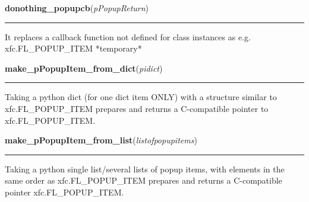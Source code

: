     \label{xformslib:library:donothing_popupcb}

    \vspace{0.5ex}

\hspace{.8\funcindent}\begin{boxedminipage}{\funcwidth}

    \raggedright \textbf{donothing\_popupcb}(\textit{pPopupReturn})

    \vspace{-1.5ex}

    \rule{\textwidth}{0.5\fboxrule}
\setlength{\parskip}{2ex}
    It replaces a callback function not defined for class instances as e.g.
    xfc.FL\_POPUP\_ITEM            *temporary*

\setlength{\parskip}{1ex}
    \end{boxedminipage}

    \label{xformslib:library:make_pPopupItem_from_dict}

    \vspace{0.5ex}

\hspace{.8\funcindent}\begin{boxedminipage}{\funcwidth}

    \raggedright \textbf{make\_pPopupItem\_from\_dict}(\textit{pidict})

    \vspace{-1.5ex}

    \rule{\textwidth}{0.5\fboxrule}
\setlength{\parskip}{2ex}
    Taking a python dict (for one dict item ONLY) with a structure similar 
    to xfc.FL\_POPUP\_ITEM prepares and returns a C-compatible pointer to 
    xfc.FL\_POPUP\_ITEM.

\setlength{\parskip}{1ex}
    \end{boxedminipage}

    \label{xformslib:library:make_pPopupItem_from_list}

    \vspace{0.5ex}

\hspace{.8\funcindent}\begin{boxedminipage}{\funcwidth}

    \raggedright \textbf{make\_pPopupItem\_from\_list}(\textit{listofpopupitems})

    \vspace{-1.5ex}

    \rule{\textwidth}{0.5\fboxrule}
\setlength{\parskip}{2ex}
    Taking a python single list/several lists of popup items, with elements
    in the same order as xfc.FL\_POPUP\_ITEM prepares and returns a 
    C-compatible pointer xfc.FL\_POPUP\_ITEM.

\setlength{\parskip}{1ex}
    \end{boxedminipage}

